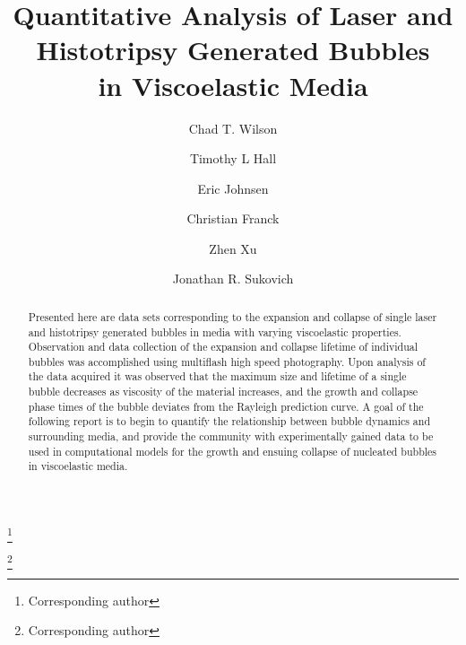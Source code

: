 \documentclass[prl,aps,epsf,twocolumn,superscriptaddress]{revtex4-1}
\begin{document}
\title{Quantitative Analysis of Laser and Histotripsy Generated Bubbles\\ in Viscoelastic Media}

\author{Chad T. Wilson}
\thanks{Corresponding author}

\author{Timothy L Hall}

\author{Eric Johnsen}

\author{Christian Franck}

\author{Zhen Xu}

\author{Jonathan R. Sukovich}
\thanks{Corresponding author}

\begin{abstract}
Presented here are data sets corresponding to the expansion and collapse of single laser and histotripsy generated bubbles in media with varying viscoelastic properties. Observation and data collection of the expansion and collapse lifetime of individual bubbles was accomplished using multiflash high speed photography. Upon analysis of the data acquired it was observed that the maximum size and lifetime of a single bubble decreases as viscosity of the material increases, and the growth and collapse phase times of the bubble deviates from the Rayleigh prediction curve. A goal of the following report is to begin to quantify the relationship between bubble dynamics and surrounding media, and provide the community with experimentally gained data to be used in computational models for the growth and ensuing collapse of nucleated bubbles in viscoelastic media.
\end{abstract}

\maketitle
\end{document}
